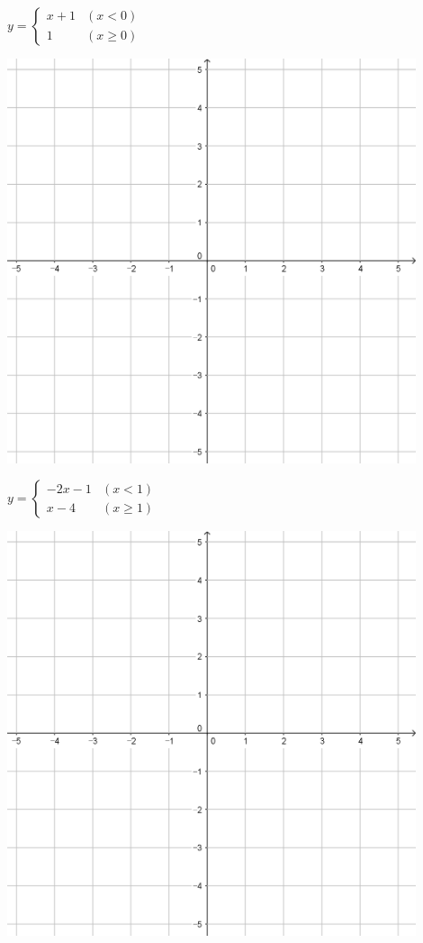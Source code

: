 \documentclass{oblivoir}
\begin{document}
\begin{minipage}{0.45\textwidth}\centering
\(y=\begin{cases}x+1&(x<0)\\1&(x\ge0)\end{cases}\)
\par\bigskip\includegraphics[width=0.9\textwidth]{55}
\end{minipage}
\begin{minipage}{0.45\textwidth}\centering
\(y=\begin{cases}-2x-1&(x<1)\\x-4&(x\ge1)\end{cases}\)
\par\bigskip\includegraphics[width=0.9\textwidth]{55}
\end{minipage}\bigskip\bigskip\par
\end{document}
